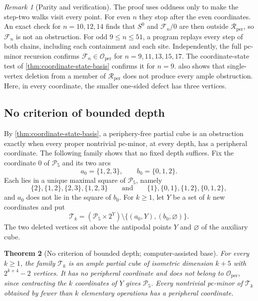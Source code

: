 \documentclass[11pt]{article}
\newtheorem{theorem}{Theorem}[section]
\theoremstyle{definition}
\theoremstyle{remark}
\newtheorem{remark}[theorem]{Remark}
\newcommand{\Rper}{\mathcal R_{\mathrm{per}}}
\newcommand{\Oper}{\mathcal O_{\mathrm{per}}}
\begin{document}
\begin{remark}[Parity and verification]
\label{rem:step-two-parity}
The proof uses oddness only to make the step-two walks visit every point.
For even \(n\) they stop after the even coordinates.  An exact check for
\(n=10,12,14\) finds that \(S^0\) and \(\mathcal F_n/0\) are then outside
\(\Rper\), so \(\mathcal F_n\) is not an obstruction.  For odd
\(9\le n\le51\), a program replays every step of both chains, including
each containment and each site.  Independently, the full pc-minor recursion
confirms \(\mathcal F_n\in\Oper\) for \(n=9,11,13,15,17\).  The
coordinate-state test of \cref{thm:coordinate-state-basis} confirms it for
\(n=9\).   also shows that single-vertex deletion from a
member of \(\Rper\) does not produce every ample obstruction.  Here, in
every coordinate, the smaller one-sided defect has three vertices.
\end{remark}

\subsection{No criterion of bounded depth}
\label{sec:no-bounded-depth}

By \cref{thm:coordinate-state-basis}, a periphery-free partial cube is an
obstruction exactly when every proper nontrivial pc-minor, at every depth,
has a peripheral coordinate.  The following family shows that no fixed
depth suffices.  Fix the coordinate \(0\) of \(\mathcal P_5\) and its two
arcs
\[
 a_0=\{1,2,3\},\qquad b_0=\{0,1,2\}.
\]
Each lies in a unique maximal square of \(\mathcal P_5\), namely
\[
 \{2\},\{1,2\},\{2,3\},\{1,2,3\}
 \qquad\text{and}\qquad
 \{1\},\{0,1\},\{1,2\},\{0,1,2\},
\]
and \(a_0\) does not lie in the square of \(b_0\).  For \(k\ge1\), let
\(Y\) be a set of \(k\) new coordinates and put
\begin{equation}
 \mathcal T_k=(\mathcal P_5\times2^Y)\setminus\{(a_0,Y),(b_0,\varnothing)\}.
 \label{eq:puncture-tower}
\end{equation}
The two deleted vertices sit above the antipodal points \(Y\) and
\(\varnothing\) of the auxiliary cube.

\begin{theorem}[No criterion of bounded depth; computer-assisted base]
\label{thm:no-bounded-depth}
For every \(k\ge1\), the family \(\mathcal T_k\) is an ample partial cube of
isometric dimension \(k+5\) with \(2^{k+4}-2\) vertices.  It has no
peripheral coordinate and does not belong to \(\Oper\), since contracting
the \(k\) coordinates of \(Y\) gives \(\mathcal P_5\).  Every nontrivial
pc-minor of \(\mathcal T_k\) obtained by fewer than \(k\) elementary
operations has a peripheral coordinate.
\end{theorem}
\end{document}
